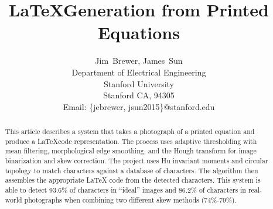 \documentclass[journal]{IEEEtran}
\begin{document}
%
\title{\LaTeX Generation from Printed Equations}
%
%
%

\author{Jim~Brewer, James~Sun
        \\
        Department of Electrical Engineering\\
        Stanford University\\
        Stanford CA, 94305\\
        Email: \{jebrewer, jsun2015\}@stanford.edu}


\maketitle

\begin{abstract}
This article describes a system that takes a photograph of a printed equation and produce a \LaTeX code representation. The process uses adaptive thresholding with mean filtering, morphological edge smoothing, and the Hough transform for image binarization and skew correction. The project uses Hu invariant moments and circular topology to match characters against a database of characters. The algorithm then assembles the appropriate LaTeX code from the detected characters. This system is able to detect 93.6\% of characters in “ideal” images and 86.2\% of characters in real-world photographs when combining two different skew methods (74\%-79\%).
\end{abstract}
\end{document}
